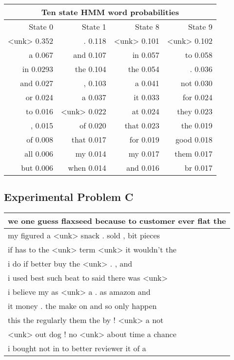 \begin{center}

    \begin{tabular}{ |r|r|r|r| }

        \hline
        \multicolumn{4}{|c|}{Ten state HMM word probabilities} \\
        \hline
        State 0     & State 1     & State 8     & State 9      \\
        \hline
        <unk> 0.352 & . 0.118     & <unk> 0.101 & <unk> 0.102  \\
        a 0.067     & and 0.107   & in 0.057    & to 0.058     \\
        in 0.0293   & the 0.104   & the 0.054   & . 0.036      \\
        and 0.027   & , 0.103     & a 0.041     & not 0.030    \\
        or 0.024    & a 0.037     & it 0.033    & for 0.024    \\
        to 0.016    & <unk> 0.022 & at 0.024    & they 0.023   \\
        , 0.015     & of 0.020    & that 0.023  & the 0.019    \\
        of 0.008    & that 0.017  & for 0.019   & good 0.018   \\
        all 0.006   & my 0.014    & my 0.017    & them 0.017   \\
        but 0.006   & when 0.014  & and 0.016   & br 0.017     \\
        \hline
    \end{tabular}
\end{center}

\subsection*{Experimental Problem C}

\begin{center}
    \begin{tabular}{|l|}
        \hline
        we one guess flaxseed because to customer ever flat the \\ \hline
        my figured a <unk> snack . sold , bit pieces            \\ \hline
        if has to the <unk> term <unk> it wouldn't the          \\ \hline
        i do if better buy the <unk> . , and                    \\ \hline
        i used best such beat to said there was <unk>           \\ \hline
        i believe my as <unk> a . as amazon and                 \\ \hline
        it money . the make on and so only happen               \\ \hline
        this the regularly them the by ! <unk> a not            \\ \hline
        <unk> out dog ! no <unk> about time a chance            \\ \hline
        i bought not in to better reviewer it of a              \\ \hline
    \end{tabular}
\end{center}

